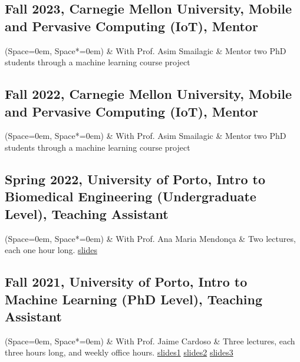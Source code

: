 \documentclass[10pt,letterpaper,pdf]{article}
\begin{document}
\subsection{\small Fall 2023, Carnegie Mellon University, Mobile and Pervasive Computing (IoT), Mentor}
\begin{easylist} \ListProperties(Space=0em, Space*=0em)
    & With Prof. Asim Smailagic
    & Mentor two PhD students through a machine learning course project
\end{easylist}

\subsection{\small Fall 2022, Carnegie Mellon University, Mobile and Pervasive Computing (IoT), Mentor}
\begin{easylist} \ListProperties(Space=0em, Space*=0em)
    & With Prof. Asim Smailagic
    & Mentor two PhD students through a machine learning course project
\end{easylist}

\subsection{\small Spring 2022, University of Porto, Intro to Biomedical Engineering (Undergraduate
Level), Teaching Assistant}
\begin{easylist} \ListProperties(Space=0em, Space*=0em)
    & With Prof. Ana Maria Mendon{\c{c}}a
    & Two lectures, each one hour long.  \href{https://docs.google.com/presentation/d/1lco5nlckinGk8RVHosJapeGzfjR6MUC9TbwOuRjUSms/edit?usp=sharing}{slides}
\end{easylist}

\subsection{\small Fall 2021, University of Porto, Intro to Machine Learning (PhD Level), Teaching Assistant}
\begin{easylist} \ListProperties(Space=0em, Space*=0em)
    & With Prof. Jaime Cardoso
    & Three lectures, each three hours long, and weekly office hours. \href{https://docs.google.com/presentation/d/1joBU3QM3jcpMYBDeFdvwiuDHdXrLZweiAiW1BgXMN7E/edit?usp=sharing}{slides1} \href{https://docs.google.com/presentation/d/1OkectcY5ImaDDD-a2M4ZRNoKgxxkM5DyoJ3oRK_vKn8/edit?usp=sharing}{slides2} \href{https://docs.google.com/presentation/d/14uhYMDF_xdyQosnJnFvr8sqUh31SGAtaN7V4Ob6f13Q/edit?usp=sharing}{slides3}
\end{easylist}
\end{document}
